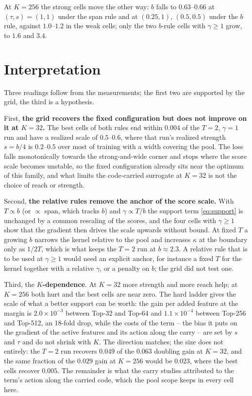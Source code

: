 \documentclass[11pt,a4paper]{article}
\begin{document}
At $K = 256$ the strong cells move the other way: $b$ falls to $0.63$--$0.66$
at $(\tau, s) = (1, 1)$ under the span rule and at $(0.25, 1)$, $(0.5, 0.5)$
under the $b$ rule, against $1.0$--$1.2$ in the weak cells; only the two
$b$-rule cells with $\gamma \ge 1$ grow, to $1.6$ and $3.4$.

\section{Interpretation}

Three readings follow from the measurements; the first two are supported by
the grid, the third is a hypothesis.

First, \textbf{the grid recovers the fixed configuration but does not
improve on it at $K = 32$.} The best cells of both rules end within $0.004$ of
the $T = 2$, $\gamma = 1$ run and have a realized scale of $0.5$--$0.6$, where
that run's realized strength $s = b/4$ is $0.2$--$0.5$ over most of training
with a width covering the pool. The loss falls monotonically towards the
strong-and-wide corner and stops where the score scale becomes unstable, so
the fixed configuration already sits near the optimum of this family, and
what limits the code-carried surrogate at $K = 32$ is not the choice of
reach or strength.

Second, \textbf{the relative rules remove the anchor of the score scale.}
With $T \propto b$ (or $\propto$ span, which tracks $b$) and $\gamma \propto
T/b$ the support term \eqref{eq:support} is unchanged by a common rescaling
of the scores, and the four cells with $\gamma \ge 1$ show that the gradient
then drives the scale upwards without bound. At fixed $T$ a growing $b$
narrows the kernel relative to the pool and increases $\kappa$ at the
boundary only as $1/2T$, which is what keeps the $T = 2$ run at $b \approx
2.3$. A relative rule that is to be used at $\gamma \ge 1$ would need an
explicit anchor, for instance a fixed $T$ for the kernel together with a
relative $\gamma$, or a penalty on $b$; the grid did not test one.

Third, the \textbf{$K$-dependence}. At $K = 32$ more strength and more reach
help; at $K = 256$ both hurt and the best cells are near zero. The hard
ladder gives the scale of what a better support can be worth: the gain per
added feature at the margin is $2.0 \times 10^{-3}$ between Top-32 and Top-64
and $1.1 \times 10^{-4}$ between Top-256 and Top-512, an 18-fold drop, while
the costs of the term -- the bias it puts on the gradient of the active
features and its action along the carry -- are set by $s$ and $\tau$ and do
not shrink with $K$. The direction matches; the size does not entirely: the
$T = 2$ run recovers $0.049$ of the $0.063$ doubling gain at $K = 32$, and the
same fraction of the $0.029$ gain at $K = 256$ would be $0.023$, where the
best cells recover $0.005$. The remainder is what the carry studies
attributed to the term's action along the carried code, which the pool
scope keeps in every cell here.
\end{document}
